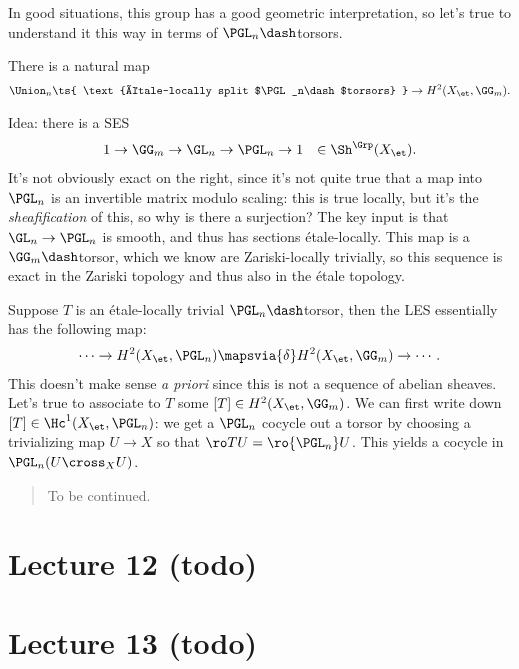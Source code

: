 In good situations, this group has a good geometric interpretation, so
let's true to understand it this way in terms of \(\PGL_n\dash\)torsors.

\begin{claim}

There is a natural map
\begin{align*}  
\Union_n \ts{ \text{étale-locally split $\PGL_n\dash$torsors} }
\to
H^2(X_\et, \GG_m)
.\end{align*}

\end{claim}

Idea: there is a SES
\begin{align*}  
1 \to \GG_m \to \GL_n \to \PGL_n \to 1
&& \in \Sh^{\Grp}(X_\et)
.\end{align*} It's not obviously exact on the right, since it's not
quite true that a map into \(\PGL_n\) is an invertible matrix modulo
scaling: this is true locally, but it's the \emph{sheafification} of
this, so why is there a surjection? The key input is that
\(\GL_n\to \PGL_n\) is smooth, and thus has sections étale-locally. This
map is a \(\GG_m\dash\)torsor, which we know are Zariski-locally
trivially, so this sequence is exact in the Zariski topology and thus
also in the étale topology.

Suppose \(T\) is an étale-locally trivial \(\PGL_n\dash\)torsor, then
the LES essentially has the following map:
\begin{align*}  
\cdots \to H^2(X_\et, \PGL_n) \mapsvia{\delta} H^2(X_\et, \GG_m) \to \cdots
.\end{align*} This doesn't make sense \emph{a priori} since this is not
a sequence of abelian sheaves. Let's true to associate to \(T\) some
\([T]\in H^2(X_\et, \GG_m)\). We can first write down
\([T] \in \Hc^1(X_\et, \PGL_n)\): we get a \(\PGL_n\) cocycle out a
torsor by choosing a trivializing map \(U\to X\) so that
\(\ro T U = \ro {\PGL_n} U\). This yields a cocycle in
\(\PGL_n(U\cross_X U)\).

\begin{quote}
To be continued.
\end{quote}

\hypertarget{lecture-12-todo}{%
\section{Lecture 12 (todo)}\label{lecture-12-todo}}

\hypertarget{lecture-13-todo}{%
\section{Lecture 13 (todo)}\label{lecture-13-todo}}

